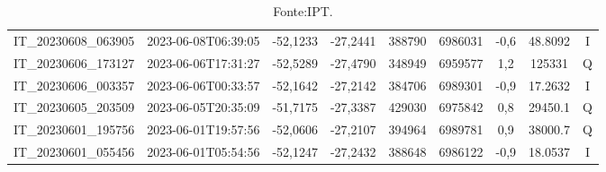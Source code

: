 \begin{table}[htb!]
\begin{tabular}{ccccS[table-format=6.0]S[table-format=7.0]ccc}
        IT\_20230608\_063905 & 2023-06-08T06:39:05 & -52,1233 & -27,2441 & 388790 & 6986031 & -0,6 & \num[round-precision=3,round-mode=figures,scientific-notation=true]{48.8092} & I \\
        IT\_20230606\_173127 & 2023-06-06T17:31:27 & -52,5289 & -27,4790 & 348949 & 6959577 & 1,2 & \num[round-precision=3,round-mode=figures,scientific-notation=true]{125331} & Q \\
        IT\_20230606\_003357 & 2023-06-06T00:33:57 & -52,1642 & -27,2142 & 384706 & 6989301 & -0,9 & \num[round-precision=3,round-mode=figures,scientific-notation=true]{17.2632} & I \\
        IT\_20230605\_203509 & 2023-06-05T20:35:09 & -51,7175 & -27,3387 & 429030 & 6975842 & 0,8 & \num[round-precision=3,round-mode=figures,scientific-notation=true]{29450.1} & Q \\
        IT\_20230601\_195756 & 2023-06-01T19:57:56 & -52,0606 & -27,2107 & 394964 & 6989781 & 0,9 & \num[round-precision=3,round-mode=figures,scientific-notation=true]{38000.7} & Q \\
        IT\_20230601\_055456 & 2023-06-01T05:54:56 & -52,1247 & -27,2432 & 388648 & 6986122 & -0,9 & \num[round-precision=3,round-mode=figures,scientific-notation=true]{18.0537} & I \\
        \bottomrule
    \end{tabular}
    \label{tab:dados_terremoto}
    \caption*{Fonte:IPT.}
\end{table}
